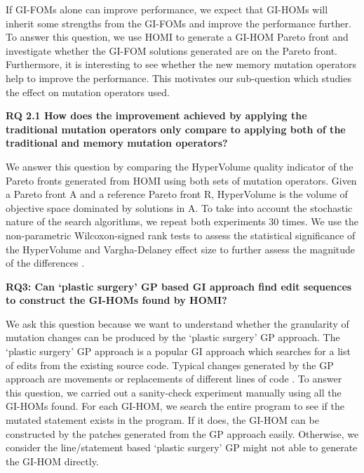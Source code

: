 \documentclass[oribibl]{llncs}
\begin{document}
If GI-FOMs alone can improve performance, we expect that GI-HOMs will inherit some strengths from the GI-FOMs and improve the performance further. To answer this question, we use HOMI to generate a GI-HOM Pareto front and investigate whether the GI-FOM solutions generated are on the Pareto front. Furthermore, it is interesting to see whether the new memory mutation operators help to improve the performance. This motivates our sub-question which studies the effect on mutation operators used. 

\vspace{2mm}
\noindent\textbf{RQ 2.1 How does the improvement achieved by applying the traditional mutation operators only compare to applying both of the traditional and memory mutation operators? }
\vspace{2mm}

We answer this question by comparing the HyperVolume quality indicator of the Pareto fronts generated from HOMI using both sets of mutation operators. Given a Pareto front A and a reference Pareto front R, HyperVolume is the volume of objective space dominated by solutions in A. To take into account the stochastic nature of the search algorithms, we repeat both experiments 30 times. We use the non-parametric Wilcoxon-signed rank tests to assess the statistical significance of the HyperVolume and Vargha-Delaney effect size to further assess the magnitude of the differences \cite{STVR:STVR1486, Neumann2015}. 

\vspace{2mm}
\noindent\textbf{RQ3: Can `plastic surgery' GP based GI approach find edit sequences to construct the GI-HOMs found by HOMI?}
\vspace{2mm}

We ask this question because we want to understand whether the granularity of mutation changes can be produced by the  `plastic surgery' GP approach. The  `plastic surgery' GP approach is a popular GI approach which searches for a list of edits from the existing source code. Typical changes generated by the GP approach are movements or replacements of different lines of code \cite{justyna2013, 6733370}. To answer this question, we carried out a sanity-check experiment manually using all the GI-HOMs found. For each GI-HOM, we search the entire program to see if the mutated statement exists in the program. If it does, the GI-HOM can be constructed by the patches generated from the GP approach easily. Otherwise, we consider the line/statement based `plastic surgery' GP might not able to generate the GI-HOM directly. 
\end{document}

